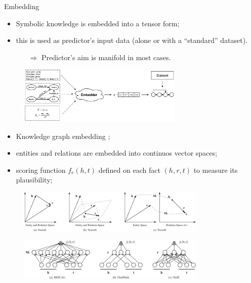 \documentclass[presentation]{beamer}\mode<presentation>{\usetheme{AMSBolognaFC}}
\begin{document}
\begin{frame}[allowframebreaks]{Embedding}
    \begin{itemize}
        \item Symbolic knowledge is embedded into a tensor form;
        \item this is used as predictor's input data (alone or with a ``standard'' dataset).
        \begin{itemize}
            \item[$\Rightarrow$] Predictor's aim is manifold in most cases.
        \end{itemize} 
    \end{itemize}
    
    \begin{figure}
        \centering
        \includegraphics[width=0.7\textwidth]{figures/ski-embedding}
    \end{figure}
    \framebreak
    \begin{itemize}
        \item Knowledge graph embedding ;
        \item entities and relations are embedded into continuos vector spaces;
        \item scoring function $f_{r}(h,t)$ defined on each fact $(h, r, t)$ to measure its plausibility;
    \end{itemize}
    \begin{figure}
        \centering
        \includegraphics[width=0.8\textwidth]{figures/kge-space.png}
    \end{figure}
    
    \framebreak
    
    \begin{figure}
        \centering
        \includegraphics[width=0.8\textwidth]{figures/kge-nn-1.png}
    \end{figure}
    

\end{frame}
\end{document}
